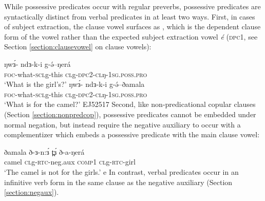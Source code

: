 While possessive predicates occur with regular preverbs, possessive predicates are syntactically distinct from verbal predicates in at least two ways. First, in cases of subject extraction, the clause vowel surfaces as , which is the dependent clause form of the vowel rather than the expected subject extraction vowel \textit{é} (\textsc{dpc1}, see Section \ref{section:clausevowel} on clause vowels):

\ea
\ea \gll  	ŋwɜ́- ndɜ-k-i 	g-ə́--ŋerá\\
			\textsc{foc}-what-\textsc{scl}g-this \textsc{cl}g-\textsc{dpc2}-\textsc{cl}ŋ-\textsc{1sg.poss.pro}\\
	\glt 	`What is the girl's?'
\ex \gll  	ŋwɜ́- ndɜ-k-i 	g-ə́--ðamala \\
			\textsc{foc}-what-\textsc{scl}g-this \textsc{cl}g-\textsc{dpc2}-\textsc{cl}ŋ-\textsc{1sg.poss.pro}\\
	\glt 	`What is for the camel?'   \hfill EJ52517
	\z 
\z 
Second, like non-predicational copular clauses (Section \ref{section:nonpredcop}), possessive predicates cannot be embedded under normal negation, but instead require the negative auxiliary to occur with a complementizer which embeds a possessive predicate with the main clause vowel:

\ea 
\gll  ðamala ð-ɜ-n:ɜ́  t̪ɜ́	ð-a-ŋerá\\
      camel  \textsc{cl}g-\textsc{rtc}-neg.aux \textsc{comp1} \textsc{cl}g-\textsc{rtc}-girl\\
\glt `The camel is not for the girls.' e%
\z 
In contrast, verbal predicates occur in an infinitive verb form in the same clause as the negative auxiliary (Section \ref{section:negaux}). 



%


	
%
	
	
%
%




